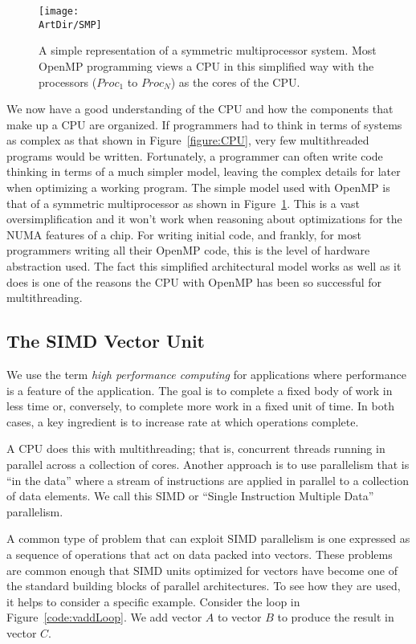 \begin{figure}[t]
\centerline{\texttt{[image: \\ArtDir/SMP]}}
\caption{A simple representation of a symmetric multiprocessor system.  Most OpenMP programming views a CPU
in this simplified way with the processors ($Proc_1$ to $Proc_N$) as the cores of the CPU.}
\label{figure:SMP}
\end{figure}

We now have a good understanding of the CPU and how the components that make up a CPU are organized.  If programmers had
to think in terms of systems as complex as that shown in Figure~\ref{figure:CPU}, very few multithreaded programs would be written.
Fortunately, a programmer can often write code thinking in terms of a much simpler model, leaving the complex details for later when
optimizing a working program. The simple model used with OpenMP is that of a symmetric multiprocessor as shown in Figure~\ref{figure:SMP}.
This is a vast oversimplification and it won't work when reasoning about optimizations for the NUMA features of a chip.  For writing initial code, and 
frankly, for most programmers writing all their OpenMP code, this is the level of hardware abstraction used.  The fact this simplified architectural 
model works as well as it does is one of the reasons the CPU with OpenMP has been so successful for multithreading. 


\subsection{The SIMD Vector Unit}

We use the term \emph{high performance computing} for applications
where performance is a feature of the application.
The goal is to complete a fixed body of work in less time or, conversely, to complete more work in a fixed unit of time.
In both cases, a key ingredient is to increase rate at which operations complete.   

A CPU does this with multithreading; that is, concurrent threads running in parallel across a collection of cores. 
Another approach is to use parallelism that is ``in the data'' where a stream of instructions are applied in
parallel to a collection of data elements.  We call this 
SIMD or ``Single Instruction Multiple Data'' parallelism.

A common type of problem that can exploit SIMD parallelism is one expressed as a sequence of
operations that act on data packed into vectors.   These problems are common enough that SIMD units optimized
for vectors have become one of the standard building blocks of parallel architectures.  To see
how they are used, it helps to consider a specific example.  Consider the loop in Figure~\ref{code:vaddLoop}.  
We add vector $A$ to vector $B$ to produce the result in vector $C$.   


